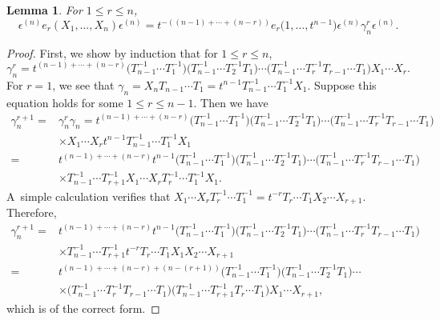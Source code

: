 \documentclass[pdftex]{sigma}
\numberwithin{equation}{section}
\newtheorem{Lemma}[Theorem]{Lemma}
\theoremstyle{definition}
\begin{document}
\begin{Lemma}\label{multiplication in terms of gamma}
For $1\leq r \leq n$,
\[\epsilon^{(n)}e_r(X_1,\dots, X_n)\epsilon^{(n)} = t^{-( (n-1)+\cdots + (n-r))}e_r\bigl(1,\dots,t^{n-1}\bigr) \epsilon^{(n)} \gamma_n^r \epsilon^{(n)}.\]
\end{Lemma}
\begin{proof}
 First, we show by induction that for $1 \leq r \leq n$,
 \[
 \gamma_n^{r} = t^{(n-1)+\cdots + (n-r)} \bigl(T_{n-1}^{-1}\cdots T_1^{-1}\bigr)\bigl(T_{n-1}^{-1}\cdots T_2^{-1}T_1\bigr)\cdots \bigl(T_{n-1}^{-1}\cdots T_r^{-1}T_{r-1}\cdots T_1\bigr) X_1\cdots X_r.
 \]
 For $r=1$, we see that
$
 \gamma_n = X_nT_{n-1}\cdots T_1 = t^{n-1}T_{n-1}^{-1}\cdots T_1^{-1}X_1$.
 Suppose this equation holds for some $1\leq r \leq n-1$. Then we have
 \begin{align*}
 \gamma_n^{r+1} = {}&\gamma_n^{r} \gamma_n
 = t^{(n-1)+\cdots + (n-r)} \bigl(T_{n-1}^{-1}\cdots T_1^{-1}\bigr)\bigl(T_{n-1}^{-1}\cdots T_2^{-1}T_1\bigr)\cdots \bigl(T_{n-1}^{-1}\cdots T_r^{-1}T_{r-1}\cdots T_1\bigr) \\
 &\times X_1\cdots X_r t^{n-1}T_{n-1}^{-1}\cdots T_1^{-1}X_1 \\
 = {}& t^{(n-1)+\cdots + (n-r)} t^{n-1}\bigl(T_{n-1}^{-1}\cdots T_1^{-1}\bigr)\bigl(T_{n-1}^{-1}\cdots T_2^{-1}T_1\bigr)\cdots \bigl(T_{n-1}^{-1}\cdots T_r^{-1}T_{r-1}\cdots T_1\bigr) \\
 & \times T_{n-1}^{-1}\cdots T_{r+1}^{-1} X_1\cdots X_r T_r^{-1}\cdots T_1^{-1}X_1.
 \end{align*}
 A~simple calculation verifies that
$
 X_1\cdots X_r T_r^{-1}\cdots T_1^{-1} = t^{-r} T_r\cdots T_1 X_2\cdots X_{r+1}$.
 Therefore,
 \begin{align*}
 \gamma_n^{r+1} ={}& t^{(n-1)+\cdots + (n-r)} t^{n-1}\bigl(T_{n-1}^{-1}\cdots T_1^{-1}\bigr)\bigl(T_{n-1}^{-1}\cdots T_2^{-1}T_1\bigr)\cdots \bigl(T_{n-1}^{-1}\cdots T_r^{-1}T_{r-1}\cdots T_1\bigr) \\
 & \times T_{n-1}^{-1}\cdots T_{r+1}^{-1} t^{-r} T_r\cdots T_1 X_1X_2\cdots X_{r+1} \\
 ={}& t^{(n-1)+\cdots + (n-r) +(n-(r+1))} \bigl(T_{n-1}^{-1}\cdots T_1^{-1}\bigr)\bigl(T_{n-1}^{-1}\cdots T_2^{-1}T_1\bigr) \cdots \\
 & \times \bigl(T_{n-1}^{-1}\cdots T_r^{-1}T_{r-1}\cdots T_1\bigr) \bigl(T_{n-1}^{-1}\cdots T_{r+1}^{-1} T_r\cdots T_1\bigr) X_1\cdots X_{r+1} ,
 \end{align*}
which is of the correct form.


\end{proof}
\end{document}
